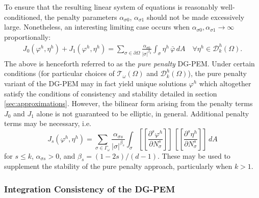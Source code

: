 	To ensure that the resulting linear system of equations is reasonably well-conditioned, the penalty parameters $\alpha_{\sigma0}$, $\alpha_{\sigma1}$ should not be made excessively large. Nonetheless, an interesting limiting case occurs when $\alpha_{\sigma0}, \alpha_{\sigma1} \rightarrow \infty$ proportionally:
	\begin{eqnarray}
		J_0 (\varphi^h,\eta^h) + J_1 (\varphi^h,\eta^h) = \sum_{\sigma \in \partial \Omega} \frac{\alpha_{\sigma0}}{|\sigma|^{\beta_0}} \int_{\sigma} \eta^h \,  \bar{\varphi} \, dA \quad \forall \eta^h \in \mathcal{D}^h_k (\Omega).
		\label{eq:pure_penalty}
	\end{eqnarray}
	The above is henceforth referred to as the \textit{pure penalty} DG-PEM. Under certain conditions (for particular choices of $\mathcal{T}_\omega (\Omega)$ and $\mathcal{D}^h_k (\Omega)$), the pure penalty variant of the DG-PEM may in fact yield unique solutions $\varphi^h$ which altogether satisfy the conditions of consistency and stability detailed in section \ref{sec:approximations}. However, the bilinear form arising from the penalty terms $J_0$ and $J_1$ alone is not guaranteed to be elliptic, in general. Additional penalty terms may be necessary, i.e.
	\begin{equation}
		J_s (\varphi^h,\eta^h) = \sum_{\sigma \in \Gamma_\omega} \frac{\alpha_{\sigma s}}{|\sigma|^{\beta_s}} \int_{\sigma} \left[\!\!\left[ \frac{\partial^s \varphi^h}{\partial N^s_{\sigma}} \right]\!\!\right] \, \left[\!\!\left[ \frac{\partial^s \eta^h}{\partial N^s_{\sigma}} \right]\!\!\right] \, dA
		\label{eq:flux_penalty}
	\end{equation}
	for $s \leq k$, $\alpha_{\sigma s} > 0$, and $\beta_s = (1-2s)/(d-1)$. These may be used to supplement the stability of the pure penalty approach, particularly when $k > 1$.
	
\subsubsection*{Integration Consistency of the DG-PEM}

